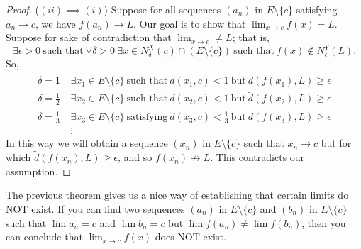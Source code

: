 \documentclass[a4paper]{article}
\begin{document}
\begin{proof}
    (\( (ii) \implies (i) \)) Suppose for all sequences \( ({a}_{n}) \) in \( E \setminus  \{ c  \}  \) satisfying \( {a}_{n} \to c  \), we have \(  f({a}_{n}) \to L \). Our goal is to show that \( \lim_{ x \to c } f(x) = L  \). Suppose for sake of contradiction that \( \lim_{ x \to c  } \neq L    \); that is,
    \[  \exists \epsilon > 0 \ \text{such that} \ \forall \delta > 0 \ \exists x \in {N}_{\delta}^{X}(c) \cap (E \setminus \{  c \} ) \ \text{such that} \ f(x) \notin {N}_{\epsilon}^{Y}(L). \]
    So,
    \begin{align*}
        \delta = 1 \  &\exists {x}_{1} \in E \setminus \{ c \} \ \text{such that} \ d({x}_{1}, c) < 1 \ \text{but} \ \tilde{d}(f({x}_{1}) , L) \geq \epsilon  \\
        \delta = \frac{ 1 }{ 2 } \  &\exists {x}_{2} \in E \setminus \{ c \} \ \text{such that} \ d({x}_{2}, c) < 1 \ \text{but} \ \tilde{d}(f({x}_{2}) , L) \geq \epsilon  \\
        \delta = \frac{ 1 }{ 3 } \  &\exists {x}_{3} \in E \setminus \{ c \}  \ \text{satisfying} \ d({x}_{3},c) < \frac{ 1 }{ 3 }  \ \text{but} \ \tilde{d}(f({x}_{3}), L) \geq \epsilon \\
                                 &\vdots
    \end{align*}
    In this way we will obtain a sequence \( ({x}_{n}) \) in \( E \setminus \{ c  \}  \) such that \( {x}_{n} \to c  \) but for which \( \tilde{d}(f({x}_{n}),L) \geq \epsilon  \), and so \( f({x}_{n}) \not\to L \). This contradicts our assumption.

\end{proof}

\begin{remark}
    The previous theorem gives us a nice way of establishing that certain limits do NOT exist. If you can find two sequences \( ({a}_{n})  \) in \( E \setminus \{ c  \}  \) and \( ({b}_{n}) \) in \( E \setminus \{ c  \}  \) such that \( \lim {a}_{n} = c  \) and \( \lim {b}_{n} = c  \) but \( \lim f({a}_{n}) \neq \lim f({b}_{n}) \), then you can conclude that \( \lim_{ x \to c } f(x) \) does NOT exist.
\end{remark}
\end{document}
